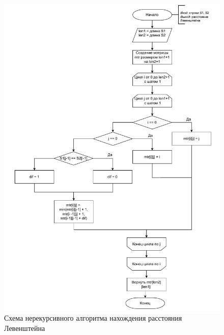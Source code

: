 \begin{figure}[h]
	\centering
	\includegraphics[height=0.7\textheight, page=1]{img/algorithms.pdf}
	\caption{Схема нерекурсивного алгоритма нахождения расстояния Левенштейна}
	\label{fig:Liter}
\end{figure}

\clearpage

